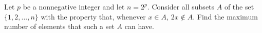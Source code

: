 Let $p$ be a nonnegative integer and let $n = 2^p$. Consider all subsets $A$ of the set $\{1,2,...,n\}$ with the property that, whenever $x \in A$, $2x \not\in A$. Find the maximum number of elements that such a set $A$ can have.
